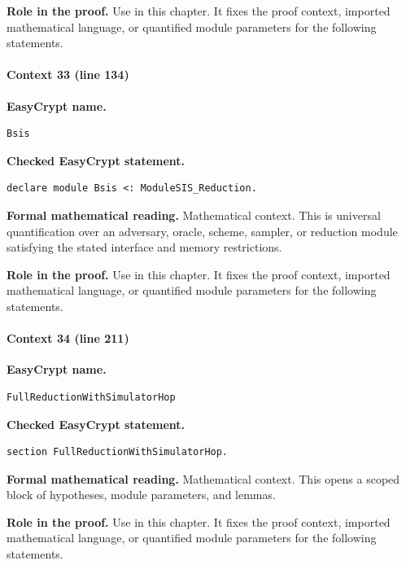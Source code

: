\noindent\textbf{Role in the proof.}
Use in this chapter. It fixes the proof context, imported mathematical language, or quantified module parameters for the following statements.

\paragraph{Context 33 (line 134)}
\noindent\textbf{EasyCrypt name.}
\begin{lstlisting}[language=EasyCrypt,basicstyle=\ttfamily\scriptsize]
Bsis
\end{lstlisting}
\noindent\textbf{Checked EasyCrypt statement.}
\begin{lstlisting}[language=EasyCrypt,basicstyle=\ttfamily\scriptsize]
declare module Bsis <: ModuleSIS_Reduction.
\end{lstlisting}
\noindent\textbf{Formal mathematical reading.}
Mathematical context. This is universal quantification over an adversary, oracle, scheme, sampler, or reduction module satisfying the stated interface and memory restrictions.

\noindent\textbf{Role in the proof.}
Use in this chapter. It fixes the proof context, imported mathematical language, or quantified module parameters for the following statements.

\paragraph{Context 34 (line 211)}
\noindent\textbf{EasyCrypt name.}
\begin{lstlisting}[language=EasyCrypt,basicstyle=\ttfamily\scriptsize]
FullReductionWithSimulatorHop
\end{lstlisting}
\noindent\textbf{Checked EasyCrypt statement.}
\begin{lstlisting}[language=EasyCrypt,basicstyle=\ttfamily\scriptsize]
section FullReductionWithSimulatorHop.
\end{lstlisting}
\noindent\textbf{Formal mathematical reading.}
Mathematical context. This opens a scoped block of hypotheses, module parameters, and lemmas.

\noindent\textbf{Role in the proof.}
Use in this chapter. It fixes the proof context, imported mathematical language, or quantified module parameters for the following statements.

